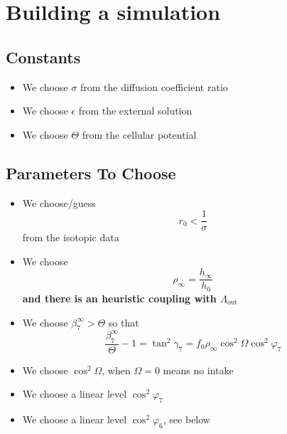 \documentclass[aps,onecolumn,10pt]{revtex4}
\newcommand{\LiAll}{\Lambda}
\newcommand{\LiAllOut}{{\LiAll}_{\mathrm{out}}}
\begin{document}
\section{Building a simulation}

\subsection{Constants}

\begin{itemize}
	\item We choose $\sigma$ from the diffusion coefficient ratio
	\item We choose $\epsilon$ from the external solution
	\item We choose $\Theta$ from the cellular potential
\end{itemize}


\subsection{Parameters To Choose}
\begin{itemize}
	\item We choose/guess 
	$$r_0<\dfrac{1}{\sigma}$$ 
	from the isotopic data
	
	\item We choose 
	\begin{equation}
		\rho_\infty =  \dfrac{h_\infty}{h_0}
	\end{equation}
	\textbf{and there is an heuristic coupling with $\LiAllOut$}
		
	
	\item We choose $\beta_7^\infty>\Theta$ so that
	\begin{equation}
		\dfrac{\beta_7^\infty}{\Theta}-1 = \tan^2 \gamma_7  = f_0 	\rho_\infty \cos^2\Omega \cos^2\varphi_7
	\end{equation}
	
	
	\item We choose $\cos^2\Omega$, when $\Omega=0$ means no intake 

	\item We choose a linear level $\cos^2 \varphi_7$
	
	\item We choose a linear level $\cos^2 \varphi_6$, see below

	\end{itemize}
\end{document}
